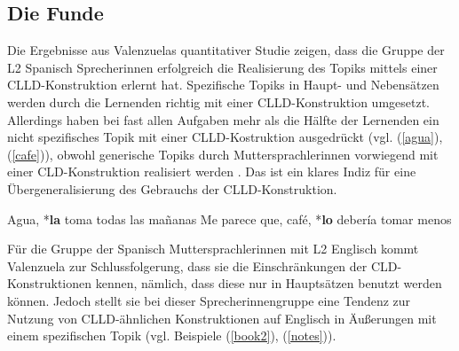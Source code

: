 
\subsection{Die Funde}

Die Ergebnisse aus Valenzuelas quantitativer Studie zeigen, dass die Gruppe der L2 Spanisch Sprecherinnen erfolgreich die Realisierung des Topiks mittels einer CLLD-Konstruktion erlernt hat.
Spezifische Topiks in Haupt- und Nebensätzen werden durch die Lernenden richtig mit einer CLLD-Konstruktion umgesetzt.
Allerdings haben bei fast allen Aufgaben mehr als die Hälfte der Lernenden ein nicht spezifisches Topik mit einer CLLD-Kostruktion ausgedrückt (vgl. (\ref{agua}), (\ref{cafe})),
obwohl generische Topiks durch Muttersprachlerinnen vorwiegend mit einer CLD-Konstruktion realisiert werden \cite{Valenzuela05}.
Das ist ein klares Indiz für eine Übergeneralisierung des Gebrauchs der CLLD-Konstruktion.

\begin{exe}
    \ex \label{agua} Agua, *\textbf{la} toma todas las mañanas
    \ex \label{cafe}Me parece que, café, *\textbf{lo} debería tomar menos
\end{exe}

Für die Gruppe der Spanisch Muttersprachlerinnen mit L2 Englisch kommt Valenzuela zur Schlussfolgerung,
dass sie die Einschränkungen der CLD-Konstruktionen kennen, nämlich, dass diese nur in Hauptsätzen benutzt werden können.
Jedoch stellt sie bei dieser Sprecherinnengruppe eine Tendenz zur Nutzung von CLLD-ähnlichen Konstruktionen auf Englisch in Äußerungen mit einem spezifischen Topik (vgl. Beispiele (\ref{book2}), (\ref{notes})).

